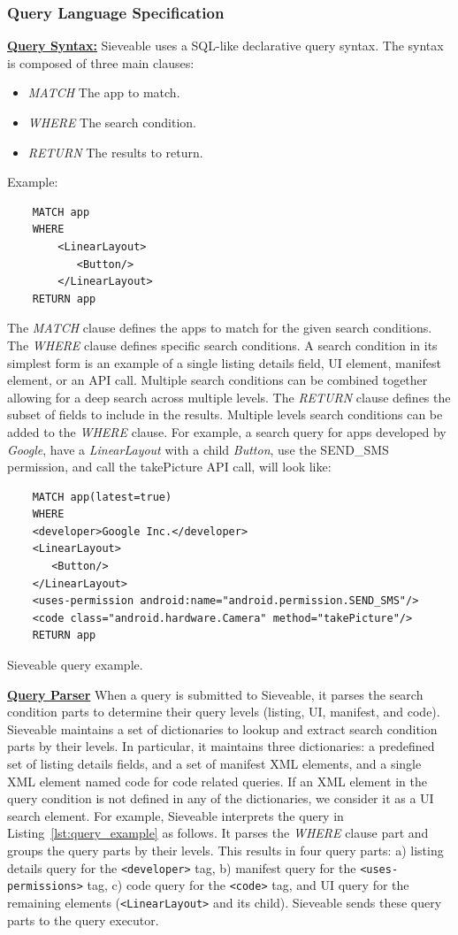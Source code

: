 \subsubsection{Query Language Specification}
\underline{\textbf{Query Syntax:}}
Sieveable uses a SQL-like declarative query syntax. The syntax is composed of three main clauses:
\begin{itemize}
	\item \textit{MATCH} The app to match. 
	\item \textit{WHERE} The search condition.
	\item \textit{RETURN} The results to return.
\end{itemize}
Example:
\begin{verbatim}
	MATCH app
	WHERE
	    <LinearLayout>
	       <Button/>
	    </LinearLayout>
	RETURN app
\end{verbatim}
The \textit{MATCH} clause defines the apps to match for the given search conditions.
The \textit{WHERE} clause defines specific search conditions. 
A search condition in its simplest form is an example of a single listing details field, UI element, manifest element, or an API call.
Multiple search conditions can be combined together allowing for a deep search across multiple levels.
The \textit{RETURN} clause defines the subset of fields to include in the results.
Multiple levels search conditions can be added to the \textit{WHERE} clause.
For example, a search query for apps developed by \textit{Google}, have a \textit{LinearLayout} with a child \textit{Button}, use the SEND\_SMS permission, and call the takePicture API call, will look like:
\begin{listing}[ht]
	\begin{verbatim}
	MATCH app(latest=true)
	WHERE
	<developer>Google Inc.</developer>
	<LinearLayout>
	   <Button/>
	</LinearLayout>
	<uses-permission android:name="android.permission.SEND_SMS"/>
	<code class="android.hardware.Camera" method="takePicture"/>
	RETURN app
	\end{verbatim}
	\caption{Sieveable query example.}
	\label{lst:query_example}
\end{listing}

\underline{\textbf{Query Parser}}
When a query is submitted to Sieveable, it parses the search condition parts to determine their query levels (listing, UI, manifest, and code).
Sieveable maintains a set of dictionaries to lookup and extract search condition parts by their levels.
In particular, it maintains three dictionaries: a predefined set of listing details fields, and a set of manifest XML elements, and a single XML element named code for code related queries.
If an XML element in the query condition is not defined in any of the dictionaries, we consider it as a UI search element.
For example, Sieveable interprets the query in Listing~\ref{lst:query_example} as follows.
It parses the \textit{WHERE} clause part and groups the query parts by their levels.
This results in four query parts: a) listing details query for the \texttt{<developer>} tag, b) manifest query for the \texttt{<uses-permissions>} tag, c) code query for the \texttt{<code>} tag, and UI query for the remaining elements (\texttt{<LinearLayout>} and its child).
Sieveable sends these query parts to the query executor.


